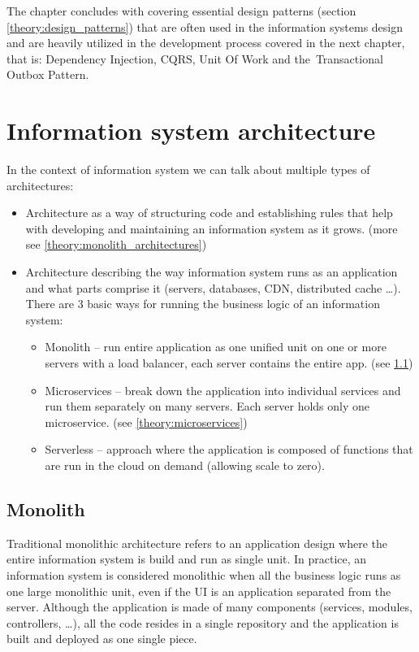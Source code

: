 The chapter concludes with covering essential design patterns (section \ref{theory:design_patterns}) that are often used in the information systems design and are heavily utilized in the development process covered in the next chapter, that is: Dependency Injection, CQRS, Unit Of Work and the~Transactional Outbox Pattern.

\newpage
\section{Information system architecture}
\label{theory:is_architecture}
In the context of information system we can talk about multiple types of architectures: 
\begin{itemize}
    \item Architecture as a way of structuring code and establishing rules that help with developing and maintaining an information system as it grows. (more see \ref{theory:monolith_architectures})
    \item Architecture describing the way information system runs as an application and what parts comprise it (servers, databases, CDN, distributed cache \dots). There are 3 basic ways for running the business logic of an information system: 
    \begin{itemize}
        \item Monolith -- run entire application as one unified unit on one or more servers with a load balancer, each server contains the entire app. (see \ref{theory:monolith})
        \item Microservices -- break down the application into individual services and run them separately on many servers. Each server holds only one microservice. (see \ref{theory:microservices})
        \item Serverless -- approach where the application is composed of functions that are run in the cloud on demand (allowing scale to zero). 
    \end{itemize}
\end{itemize}

\subsection{Monolith}
\label{theory:monolith}
Traditional monolithic architecture refers to an application design where the entire information system is build and run as single unit. In practice, an information system is considered monolithic when all the business logic runs as one large monolithic unit, even if the UI is an application separated from the server. Although the application is made of many components (services, modules, controllers, \dots), all the code resides in a single repository and the application is built and deployed as one single piece.

